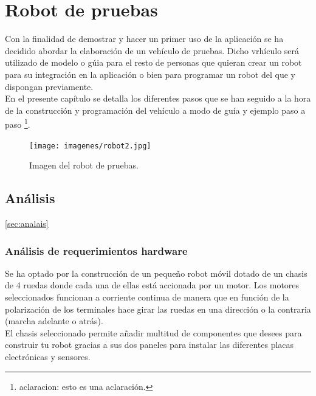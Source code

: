 \chapter{Robot de pruebas}
\label{chap:robot}

Con la finalidad de demostrar y hacer un primer uso de la aplicación se ha decidido abordar la elaboración de un vehículo de pruebas. Dicho vrhículo será utilizado de modelo o gúia para el 
resto de personas que quieran crear un robot para su integración en la aplicación o bien para programar un robot del que y dispongan previamente.\\

En el presente capítulo se detalla los diferentes pasos que se han seguido a la hora de la construcción y programación del vehículo a modo de guía y ejemplo paso a paso \footnote{aclaracion: esto es una aclaración.}.\\


\begin{figure}[H]
  \begin{center}
    \texttt{[image: imagenes/robot2.jpg]}
  \end{center}
  \caption{Imagen del robot de pruebas.}
  \label{robot:robot02}
\end{figure}


\section{Análisis}
\ref{sec:analais}




\subsection{Análisis de requerimientos hardware}
\label{sec:requerimientos-hardware}

Se ha optado por la construcción de un  pequeño robot móvil dotado de un chasis de 4 ruedas donde cada una de ellas está accionada por un motor. Los motores seleccionados funcionan a corriente continua
de manera que en función de la polarización de los terminales hace girar las ruedas en una dirección o la contraria (marcha adelante o atrás).\\

El chasis seleccionado permite añadir multitud de componentes que desees para construir tu robot gracias a sus dos paneles para instalar las diferentes
placas electrónicas y sensores.\\

